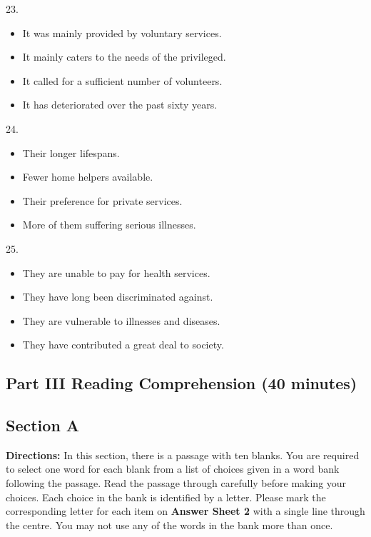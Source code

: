 \documentclass[UTF8,11pt]{ctexart}
\begin{document}
23.


\begin{itemize}[leftmargin=2em,itemsep=.2em,topsep=.4em]\item[A.] It was mainly provided by voluntary services.
\item[B.] It mainly caters to the needs of the privileged.
\item[C.] It called for a sufficient number of volunteers.
\item[D.] It has deteriorated over the past sixty years.
\end{itemize}

24.


\begin{itemize}[leftmargin=2em,itemsep=.2em,topsep=.4em]\item[A.] Their longer lifespans.
\item[B.] Fewer home helpers available.
\item[C.] Their preference for private services.
\item[D.] More of them suffering serious illnesses.
\end{itemize}

25.


\begin{itemize}[leftmargin=2em,itemsep=.2em,topsep=.4em]\item[A.] They are unable to pay for health services.
\item[B.] They have long been discriminated against.
\item[C.] They are vulnerable to illnesses and diseases.
\item[D.] They have contributed a great deal to society.
\end{itemize}

\subsection*{\textbf{Part III} \textbf{Reading Comprehension} \textbf{(40 minutes)}}


\subsection*{\textbf{Section A}}


\textbf{Directions:} In this section, there is a passage with ten blanks. You are required to select one word for each blank from a list of choices given in a word bank following the passage. Read the passage through carefully before making your choices. Each choice in the bank is identified by a letter. Please mark the corresponding letter for each item on\textbf{ Answer Sheet 2} with a single line through the centre. You may not use any of the words in the bank more than once.
\end{document}

